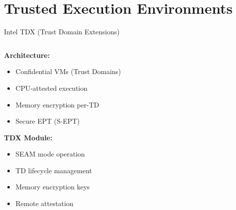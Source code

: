 \documentclass[aspectratio=169,12pt]{beamer}
\begin{document}
\section{Trusted Execution Environments}

\begin{frame}{Intel TDX (Trust Domain Extensions)}
    \begin{columns}
        \begin{column}{0.5\textwidth}
            \textbf{Architecture:}
            \begin{itemize}
                \item Confidential VMs (Trust Domains)
                \item CPU-attested execution
                \item Memory encryption per-TD
                \item Secure EPT (S-EPT)
            \end{itemize}
            
            \vspace{0.3cm}
            \textbf{TDX Module:}
            \begin{itemize}
                \item SEAM mode operation
                \item TD lifecycle management
                \item Memory encryption keys
                \item Remote attestation
            \end{itemize}
        \end{column}
        \begin{column}{0.5\textwidth}
\end{column}
\end{columns}
\end{frame}
\end{document}
